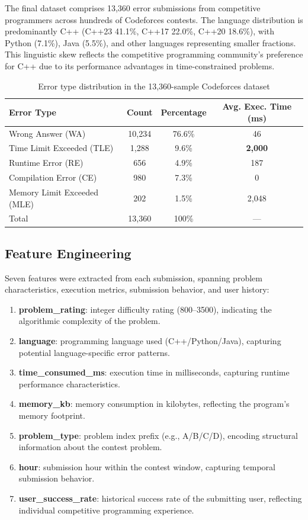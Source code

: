 \documentclass[acmsmall]{acmart}
\begin{document}
The final dataset comprises 13,360 error submissions from competitive programmers
across hundreds of Codeforces contests. The language distribution
is predominantly C++ (C++23 41.1\%, C++17 22.0\%, C++20 18.6\%), with
Python (7.1\%), Java (5.5\%), and other languages representing smaller
fractions. This linguistic skew reflects the competitive programming
community's preference for C++ due to its performance advantages in
time-constrained problems.

\begin{table}[htbp]
\centering
\caption{Error type distribution in the 13,360-sample Codeforces dataset}
\label{tab:error-dist}
\begin{tabular}{@{}lccc@{}}
\toprule
Error Type & Count & Percentage & Avg. Exec. Time (ms) \\
\midrule
Wrong Answer (WA)           & 10,234 & 76.6\% & 46 \\
Time Limit Exceeded (TLE)   & 1,288  & 9.6\% & \textbf{2,000} \\
Runtime Error (RE)          & 656    & 4.9\% & 187 \\
Compilation Error (CE)      & 980    & 7.3\% & 0 \\
Memory Limit Exceeded (MLE) & 202    & 1.5\% & 2,048 \\
\midrule
Total                       & 13,360 & 100\% & --- \\
\bottomrule
\end{tabular}
\end{table}

\subsection{Feature Engineering}

Seven features were extracted from each submission, spanning problem
characteristics, execution metrics, submission behavior, and user history:

\begin{enumerate}
    \item \textbf{problem\_rating}: integer difficulty rating (800--3500),
          indicating the algorithmic complexity of the problem.
    \item \textbf{language}: programming language used (C++/Python/Java),
          capturing potential language-specific error patterns.
    \item \textbf{time\_consumed\_ms}: execution time in milliseconds,
          capturing runtime performance characteristics.
    \item \textbf{memory\_kb}: memory consumption in kilobytes, reflecting
          the program's memory footprint.
    \item \textbf{problem\_type}: problem index prefix (e.g., A/B/C/D), encoding
          structural information about the contest problem.
    \item \textbf{hour}: submission hour within the contest window, capturing
          temporal submission behavior.
    \item \textbf{user\_success\_rate}: historical success rate of the submitting
          user, reflecting individual competitive programming experience.
\end{enumerate}
\end{document}
